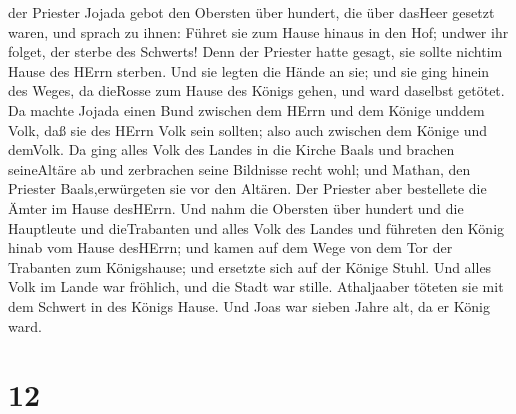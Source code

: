 der Priester Jojada gebot den Obersten über hundert, die über dasHeer
gesetzt waren, und sprach zu ihnen: Führet sie zum Hause hinaus in den
Hof; undwer ihr folget, der sterbe des Schwerts! Denn der Priester hatte
gesagt, sie sollte nichtim Hause des HErrn sterben.  Und
sie legten die Hände an sie; und sie ging hinein des Weges, da dieRosse
zum Hause des Königs gehen, und ward daselbst getötet.  Da
machte Jojada einen Bund zwischen dem HErrn und dem Könige unddem Volk,
daß sie des HErrn Volk sein sollten; also auch zwischen dem Könige und
demVolk.  Da ging alles Volk des Landes in die Kirche Baals
und brachen seineAltäre ab und zerbrachen seine Bildnisse recht wohl;
und Mathan, den Priester Baals,erwürgeten sie vor den Altären. Der
Priester aber bestellete die Ämter im Hause desHErrn.  Und
nahm die Obersten über hundert und die Hauptleute und dieTrabanten und
alles Volk des Landes und führeten den König hinab vom Hause desHErrn;
und kamen auf dem Wege von dem Tor der Trabanten zum Königshause; und
ersetzte sich auf der Könige Stuhl.  Und alles Volk im
Lande war fröhlich, und die Stadt war stille. Athaljaaber töteten sie
mit dem Schwert in des Königs Hause.  Und Joas war sieben
Jahre alt, da er König ward.

\hypertarget{section-11}{%
\section{12}\label{section-11}}

